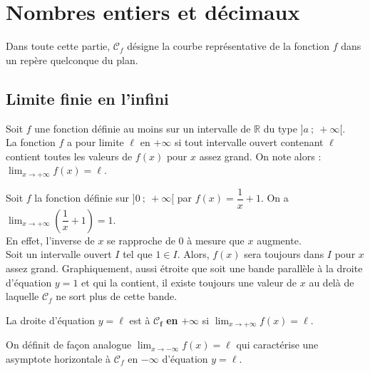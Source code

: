 \section{Nombres entiers et décimaux}


Dans toute cette partie, $\mathscr{C}_f$ désigne la courbe représentative de la fonction $f$ dans un repère quelconque du plan.

\subsection{Limite finie en l’infini}

\begin{definition}
Soit $f$ une fonction définie au moins sur un intervalle de $\mathbb{R}$ du type $]a~;~+\infty[$.\\
La fonction $f$ a pour limite $\ell$ en $+\infty$ si tout intervalle ouvert contenant $\ell$
contient toutes les valeurs de $f(x)$ pour $x$ assez grand. On note alors : $\displaystyle \lim_{x\to+\infty}f(x)=\ell$.\\
\end{definition}

\begin{exemple*1}
Soit $f$ la fonction définie sur $]0~;~+\infty[$ par $f(x)=\dfrac{1}{x}+1$. On a $\displaystyle\lim_{x\to+\infty}\left(\dfrac{1}{x}+1\right)=1$.\\
En effet, l'inverse de $x$ se rapproche de $0$ à mesure que $x$ augmente.\\
Soit un intervalle ouvert $I$ tel que $1\in I$. Alors, $f(x)$ sera toujours dans $I$ pour $x$ assez grand. Graphiquement, aussi étroite que soit une bande parallèle à la droite d'équation $y=1$ et qui la contient, il existe toujours une valeur de $x$ au delà de laquelle $\mathscr{C}_f$ ne sort plus de cette bande.
\end{exemple*1}

\begin{definition}
La droite d'équation $y=\ell$ est  à $\boldsymbol{\mathscr{C}_f}$ \textbf{en} $\boldsymbol{+\infty}$   si $\displaystyle\lim_{x\to+\infty} f(x)=\ell$.
\end{definition}

  \begin{remarque}
  On définit de façon analogue $\displaystyle\lim_{x\to-\infty} f(x)=\ell$
  qui caractérise une asymptote horizontale à $\mathscr{C}_f$ en $-\infty$ d'équation $y=\ell$.
  \end{remarque}

